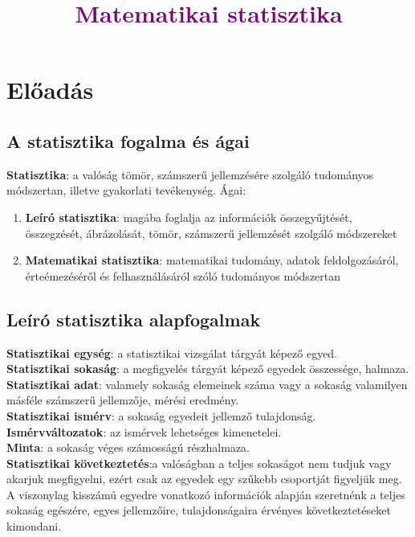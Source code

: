 \documentclass[12pt]{article}
\title{\textcolor{purple}{\Huge\textbf{Matematikai statisztika}}}
\begin{document}
    \maketitle
    \tableofcontents

    \newpage
    \section{Előadás}
    \subsection{A statisztika fogalma és ágai}
    \textbf{Statisztika}: a valóság tömör, számszerű jellemzésére szolgáló tudományos módszertan, illetve gyakorlati tevékenység.
    Ágai:
    \begin{enumerate}
        \item \textbf{Leíró statisztika}: magába foglalja az információk összegyűjtését, összegzését, ábrázolását, tömör, számszerű jellemzését szolgáló módszereket
        \item \textbf{Matematikai statisztika}: matematikai tudomány, adatok feldolgozásáról, érteémezéséről és felhasználásáról szóló tudományos módszertan
    \end{enumerate}

    \subsection{Leíró statisztika alapfogalmak}
    \textbf{Statisztikai egység}: a statisztikai vizsgálat tárgyát képező egyed.\\
    \textbf{Statisztikai sokaság}: a megfigyelés tárgyát képező egyedek összessége, halmaza.\\
    \textbf{Statisztikai adat}: valamely sokaság elemeinek száma vagy a sokaság valamilyen másféle számszerű jellemzője, mérési eredmény.\\
    \textbf{Statisztikai ismérv}: a sokaság egyedeit jellemző tulajdonság.\\
    \textbf{Ismérvváltozatok}: az ismérvek lehetséges kimenetelei.\\
    \textbf{Minta}: a sokaság véges számosságú részhalmaza.\\
    \textbf{Statisztikai következtetés}:a valóságban a teljes sokaságot nem tudjuk vagy akarjuk megfigyelni, ezért csak az egyedek egy szűkebb csoportját figyeljük meg. A viszonylag kisszámú egyedre vonatkozó információk alapján szeretnénk a teljes sokaság egészére, egyes jellemzőire, tulajdonságaira érvényes következtetéseket kimondani.\\
\end{document}
